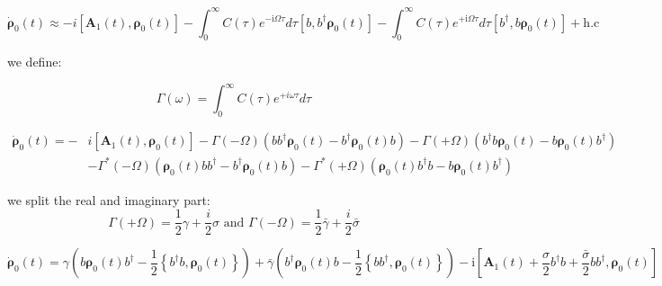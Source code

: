 \documentclass[%
preprint,
onecolumn,
notitlepag,
 amsmath,amssymb,
 aps,
 pra,
]{revtex4-2}
\begin{document}
\begin{itemize}
 \begin{equation} 
 \dot{\boldsymbol{\rho}}_0(t) \approx -i \left[ \boldsymbol{A}_1(t) , \boldsymbol{\rho}_0(t) \right]  -\int_{0}^{\infty} C(\tau) e^{-\mathrm{i} \Omega \tau} d \tau\left[b, b^{\dagger} \boldsymbol{\rho}_{\mathrm{0}}(t) \right]-\int_{0}^{\infty} C(\tau) e^{+\mathrm{i} \Omega \tau} d \tau\left[b^{\dagger}, b \boldsymbol{\rho}_{\mathrm{0}}(t) \right]+\mathrm{h} . \mathrm{c}\end{equation}
 
 we define:
 
 \begin{equation}\Gamma(\omega)=\int_{0}^{\infty} C(\tau) e^{+i \omega \tau} d \tau\end{equation}
 
 \begin{equation}\begin{aligned}
\dot{\boldsymbol{\rho}}_0(t) =-& i \left[ \boldsymbol{A}_1(t) , \boldsymbol{\rho}_0(t) \right] -\Gamma(-\Omega)\left(b b^{\dagger} \boldsymbol{\rho}_{\mathrm{0}}(t)-b^{\dagger} \boldsymbol{\rho}_{\mathrm{0}}(t) b\right)-\Gamma(+\Omega)\left(b^{\dagger} b \boldsymbol{\rho}_{\mathrm{0}}(t)-b \boldsymbol{\rho}_{\mathrm{0}}(t) b^{\dagger}\right) \\
&-\Gamma^{*}(-\Omega)\left(\boldsymbol{\rho}_{\mathrm{0}}(t) b b^{\dagger}-b^{\dagger} \boldsymbol{\rho}_{\mathrm{0}}(t) b\right)-\Gamma^{*}(+\Omega)\left(\boldsymbol{\rho}_{\mathrm{0}}(t) b^{\dagger} b-b \boldsymbol{\rho}_{\mathrm{0}}(t) b^{\dagger}\right)
\end{aligned}\end{equation}

we split the real and imaginary part:
\begin{equation}
\Gamma(+\Omega)=\frac{1}{2} \gamma+\frac{i}{2} \sigma \text { and } \Gamma(-\Omega)=\frac{1}{2} \bar{\gamma}+\frac{i}{2} \bar{\sigma}\end{equation}

\begin{equation}
\dot{\boldsymbol{\rho}}_0(t) = \gamma\left(b \boldsymbol{\rho}_{\mathrm{0}}(t) b^{\dagger}-\frac{1}{2}\left\{b^{\dagger} b, \boldsymbol{\rho}_{\mathrm{0}}(t)\right\}\right)+\bar{\gamma}\left(b^{\dagger}\boldsymbol{\rho}_{\mathrm{0}}(t) b-\frac{1}{2}\left\{b b^{\dagger}, \boldsymbol{\rho}_{\mathrm{0}}(t) \right\}\right)-\mathrm{i}\left[\boldsymbol{A}_1(t) + \frac{\sigma}{2} b^{\dagger} b+\frac{\bar{\sigma}}{2} b b^{\dagger}, \boldsymbol{\rho}_{\mathrm{0}}(t) \right]\end{equation}



\end{itemize}
\end{document}
